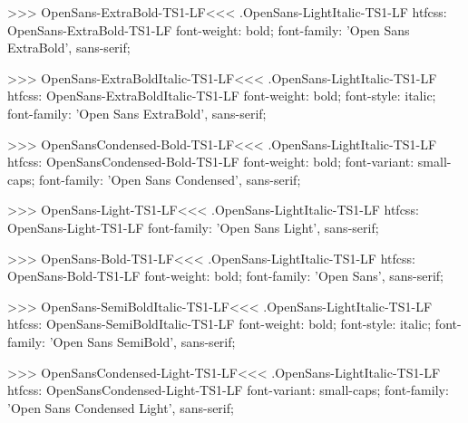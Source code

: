 >>>
\<OpenSans-ExtraBold-TS1-LF\><<<
.OpenSans-LightItalic-TS1-LF
htfcss:  OpenSans-ExtraBold-TS1-LF  font-weight: bold; font-family: 'Open Sans ExtraBold', sans-serif;

>>>
\<OpenSans-ExtraBoldItalic-TS1-LF\><<<
.OpenSans-LightItalic-TS1-LF
htfcss:  OpenSans-ExtraBoldItalic-TS1-LF  font-weight: bold; font-style: italic; font-family: 'Open Sans ExtraBold', sans-serif;

>>>
\<OpenSansCondensed-Bold-TS1-LF\><<<
.OpenSans-LightItalic-TS1-LF
htfcss:  OpenSansCondensed-Bold-TS1-LF  font-weight: bold; font-variant: small-caps; font-family: 'Open Sans Condensed', sans-serif;

>>>
\<OpenSans-Light-TS1-LF\><<<
.OpenSans-LightItalic-TS1-LF
htfcss:  OpenSans-Light-TS1-LF  font-family: 'Open Sans Light', sans-serif;

>>>
\<OpenSans-Bold-TS1-LF\><<<
.OpenSans-LightItalic-TS1-LF
htfcss:  OpenSans-Bold-TS1-LF  font-weight: bold; font-family: 'Open Sans', sans-serif;

>>>
\<OpenSans-SemiBoldItalic-TS1-LF\><<<
.OpenSans-LightItalic-TS1-LF
htfcss:  OpenSans-SemiBoldItalic-TS1-LF  font-weight: bold; font-style: italic; font-family: 'Open Sans SemiBold', sans-serif;

>>>
\<OpenSansCondensed-Light-TS1-LF\><<<
.OpenSans-LightItalic-TS1-LF
htfcss:  OpenSansCondensed-Light-TS1-LF  font-variant: small-caps; font-family: 'Open Sans Condensed Light', sans-serif;

